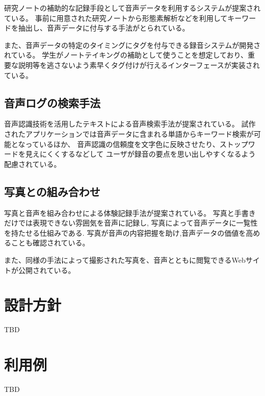 研究ノートの補助的な記録手段として音声データを利用するシステムが提案されている\cite{Kawanishi}。
事前に用意された研究ノートから形態素解析などを利用してキーワードを抽出し、音声データに付与する手法がとられている。

また、音声データの特定のタイミングにタグを付与できる録音システムが開発されている\cite{Fujisaka}。
学生がノートテイキングの補助として使うことを想定しており、重要な説明等を逃さないよう素早くタグ付けが行えるインターフェースが実装されている。

\subsection{音声ログの検索手法}

音声認識技術を活用したテキストによる音声検索手法が提案されている\cite{Vemuri}。
試作されたアプリケーションでは音声データに含まれる単語からキーワード検索が可能となっているほか、
音声認識の信頼度を文字色に反映させたり、ストップワードを見えにくくするなどして
ユーザが録音の要点を思い出しやすくなるよう配慮されている。

\subsection{写真との組み合わせ}
写真と音声を組み合わせによる体験記録手法が提案されている\cite{Nakakura}。
写真と手書きだけでは表現できない雰囲気を音声に記録し,
写真によって音声データに一覧性を持たせる仕組みである.
写真が音声の内容把握を助け,音声データの価値を高めることも確認されている。

また、同様の手法によって撮影された写真を、音声とともに閲覧できるWebサイトが公開されている\cite{Masui}。


\section{設計方針}

TBD

\section{利用例}

TBD
